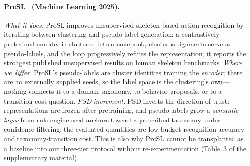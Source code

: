 \paragraph{ProSL~\citep{qin2025prosl} (Machine Learning 2025).}
\emph{What it does.} ProSL improves unsupervised skeleton-based action recognition by iterating between clustering and pseudo-label generation: a contrastively pretrained encoder is clustered into a codebook, cluster assignments serve as pseudo-labels, and the loop progressively refines the representation; it reports the strongest published unsupervised results on human skeleton benchmarks. \emph{Where we differ.} ProSL's pseudo-labels are cluster identities training the \emph{encoder}; there are no externally supplied seeds, so the label space is the clustering's own---nothing connects it to a domain taxonomy, to behavior proposals, or to a transition-cost question. \emph{PSD increment.} PSD inverts the direction of trust: representations are frozen after pretraining, and pseudo-labels grow a \emph{semantic layer} from rule-engine seed anchors toward a prescribed taxonomy under confidence filtering; the evaluated quantities are low-budget recognition accuracy and taxonomy-transition cost. This is also why ProSL cannot be transplanted as a baseline into our three-tier protocol without re-experimentation (Table~3 of the supplementary material).

